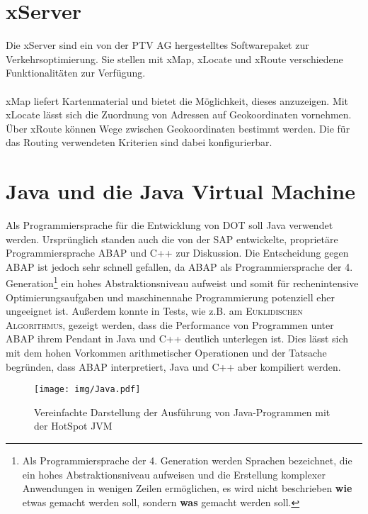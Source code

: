 \section{xServer}\label{chp:x-server}
Die xServer sind ein von der PTV AG hergestelltes Softwarepaket zur Verkehrsoptimierung. Sie stellen mit xMap, xLocate und xRoute verschiedene Funktionalitäten zur Verfügung. \\
\\
xMap liefert Kartenmaterial und bietet die Möglichkeit, dieses anzuzeigen. Mit xLocate lässt sich die Zuordnung von Adressen auf Geokoordinaten vornehmen. Über xRoute können Wege zwischen Geokoordinaten bestimmt werden. Die für das Routing verwendeten Kriterien sind dabei konfigurierbar.


\section{Java und die Java Virtual Machine}
Als Programmiersprache für die Entwicklung von \textsc{DOT} soll \textsf{Java} verwendet werden. Ursprünglich standen auch die von der SAP entwickelte, proprietäre Programmiersprache \textsf{ABAP} und \textsf{C++} zur Diskussion. Die Entscheidung gegen \textsf{ABAP} ist jedoch sehr schnell gefallen, da \textsf{ABAP} als Programmiersprache der 4. Generation\footnote{Als Programmiersprache der 4. Generation werden Sprachen bezeichnet, die ein hohes Abstraktionsniveau aufweisen und die Erstellung komplexer Anwendungen in wenigen Zeilen ermöglichen, es wird nicht beschrieben \textbf{wie} etwas gemacht werden soll, sondern \textbf{was} gemacht werden soll.\vspace*{-20pt}} ein hohes Abstraktionsniveau aufweist und somit für rechenintensive Optimierungsaufgaben und maschinennahe Programmierung potenziell eher ungeeignet ist. Außerdem konnte in Tests, wie z.B. am \textsc{Euklidischen Algorithmus}, gezeigt werden, dass die Performance von Programmen unter \textsf{ABAP} ihrem Pendant in \textsf{Java} und \textsf{C++} deutlich unterlegen ist. Dies lässt sich mit dem hohen Vorkommen arithmetischer Operationen und der Tatsache begründen, dass \textsf{ABAP} interpretiert, \textsf{Java} und \textsf{C++} aber kompiliert werden. \\

\begin{wrapfigure}{r}{0.5\textwidth}
  \vspace{-20pt}
  \begin{center}
    \texttt{[image: img/Java.pdf]}
  \end{center}
  \vspace{-10pt}
  \caption[Ausführung von \textsf{Java}-Programmen]{Vereinfachte Darstellung der Ausführung von \textsf{Java}-Programmen mit der \textsf{HotSpot JVM}}
  \label{fig:manhattan}
\end{wrapfigure}

